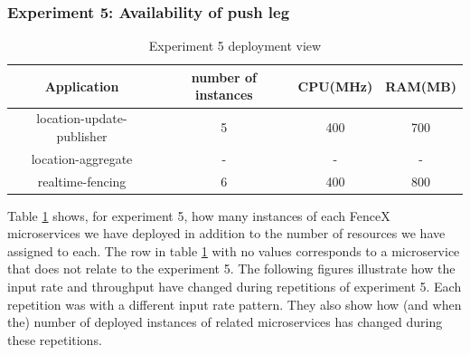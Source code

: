 \documentclass[a4]{report}
\begin{document}
    \subsubsection{Experiment 5: Availability of push leg}
    \begin{table}[h!]
        \centering
        \begin{tabular}{|c|c|c|c|}
            \hline
            Application               & number of instances & CPU(MHz) & RAM(MB) \\
            \hline
            location-update-publisher & 5                   & 400      & 700     \\
            location-aggregate        & -                   & -        & -       \\
            realtime-fencing          & 6                   & 400      & 800     \\
            \hline
        \end{tabular}
        \caption{Experiment 5 deployment view}
        \label{table:ex5-dv}
    \end{table}

    Table \ref{table:ex5-dv} shows, for experiment 5, how many instances of each FenceX microservices we have
    deployed in addition to the number of resources we have assigned to each.
    The row in table \ref{table:ex5-dv} with no values corresponds to a microservice that does not relate to the
    experiment 5.
    The following figures illustrate how the input rate and throughput have changed during repetitions of experiment 5.
    Each repetition was with a different input rate pattern.
    They also show how (and when the) number of deployed instances of related microservices has changed during these repetitions.
\end{document}
